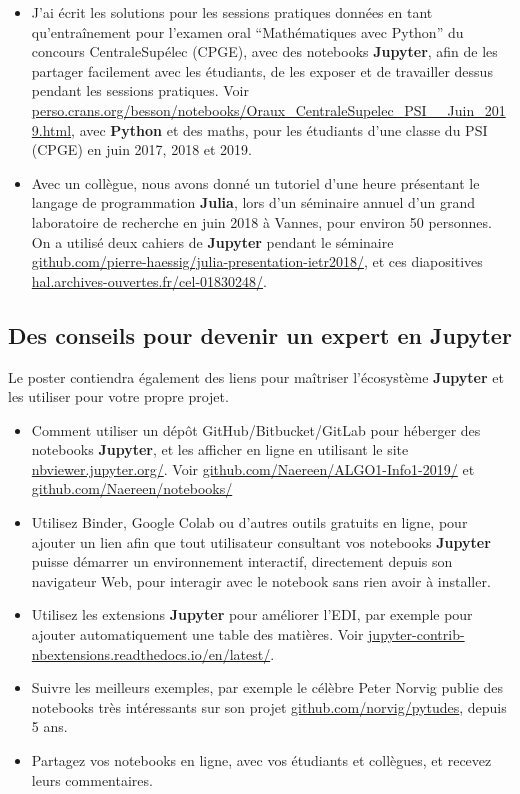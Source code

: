 \documentclass[runningheads]{llncs}
\newcommand{\Jupyter}{\textbf{Jupyter}}
\begin{document}
\begin{itemize}
    \item
    J'ai écrit les solutions pour les sessions pratiques données en tant qu'entraînement pour l'examen oral ``Mathématiques avec Python'' du concours CentraleSupélec (CPGE), avec des notebooks \Jupyter, afin de les partager facilement avec les étudiants, de les exposer et de travailler dessus pendant les sessions pratiques.
    Voir \url{perso.crans.org/besson/notebooks/Oraux_CentraleSupelec_PSI__Juin_2019.html},
    avec \textbf{Python} et des maths,
    pour les étudiants d'une classe du PSI (CPGE) en juin 2017, 2018 et 2019.

    \item
    Avec un collègue, nous avons donné un tutoriel d'une heure présentant le langage de programmation \textbf{Julia}, lors d'un séminaire annuel d'un grand laboratoire de recherche en juin 2018 à Vannes, pour environ 50 personnes.
    On a utilisé deux cahiers de \Jupyter{} pendant le séminaire \url{github.com/pierre-haessig/julia-presentation-ietr2018/},
    et ces diapositives \url{hal.archives-ouvertes.fr/cel-01830248/}.

\end{itemize}


\subsection*{Des conseils pour devenir un expert en \Jupyter}

Le poster contiendra également des liens pour maîtriser l'écosystème \Jupyter{} et les utiliser pour votre propre projet.

\begin{itemize}
    \item Comment utiliser un dépôt GitHub/Bitbucket/GitLab pour héberger des notebooks \Jupyter{}, et les afficher en ligne en utilisant le site \url{nbviewer.jupyter.org/}.
    Voir \url{github.com/Naereen/ALGO1-Info1-2019/} et \url{github.com/Naereen/notebooks/}
    \item Utilisez Binder, Google Colab ou d'autres outils gratuits en ligne, pour ajouter un lien afin que tout utilisateur consultant vos notebooks \Jupyter{} puisse démarrer un environnement interactif, directement depuis son navigateur Web, pour interagir avec le notebook sans rien avoir à installer.
    \item Utilisez les extensions \Jupyter{} pour améliorer l'EDI, par exemple pour ajouter automatiquement une table des matières. Voir \url{jupyter-contrib-nbextensions.readthedocs.io/en/latest/}.
    \item Suivre les meilleurs exemples, par exemple le célèbre Peter Norvig publie des notebooks très intéressants sur son projet \url{github.com/norvig/pytudes}, depuis 5 ans.
    \item Partagez vos notebooks en ligne, avec vos étudiants et collègues, et recevez leurs commentaires.
\end{itemize}
\end{document}
